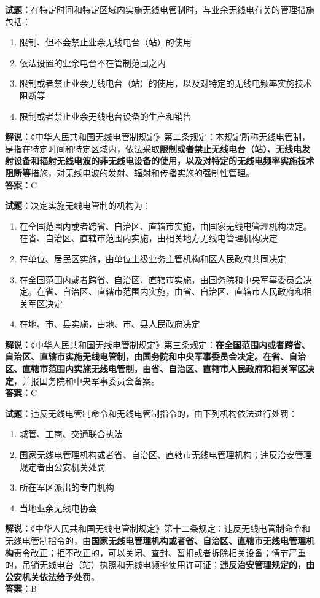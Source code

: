 \documentclass{ctexbook}
\begin{document}
\bigskip


\noindent\textbf{试题：}在特定时间和特定区域内实施无线电管制时，与业余无线电有关的管理措施包括：
\begin{enumerate}[leftmargin=3em]
	\item 限制、但不会禁止业余无线电台（站）的使用
	\item 依法设置的业余电台不在管制范围之内
	\item 限制或者禁止业余无线电台（站）的使用，以及对特定的无线电频率实施技术阻断等
	\item 限制或者禁止业余无线电台设备的生产和销售
\end{enumerate}
\noindent\textbf{解说：}《中华人民共和国无线电管制规定》第二条规定：本规定所称无线电管制，是指在特定时间和特定区域内，依法采取\textbf{限制或者禁止无线电台（站）、无线电发射设备和辐射无线电波的非无线电设备的使用，以及对特定的无线电频率实施技术阻断等}措施，对无线电波的发射、辐射和传播实施的强制性管理。\\\noindent\textbf{答案：}C


\bigskip


\noindent\textbf{试题：}决定实施无线电管制的机构为：
\begin{enumerate}[leftmargin=3em]
	\item 在全国范围内或者跨省、自治区、直辖市实施，由国家无线电管理机构决定。在省、自治区、直辖市范围内实施，由相关地方无线电管理机构决定
	\item 在单位、居民区实施，由单位上级业务主管机构和区人民政府共同决定
	\item 在全国范围内或者跨省、自治区、直辖市实施，由国务院和中央军事委员会决定。在省、自治区、直辖市范围内实施，由省、自治区、直辖市人民政府和相关军区决定
	\item 在地、市、县实施，由地、市、县人民政府决定
\end{enumerate}
\noindent\textbf{解说：}《中华人民共和国无线电管制规定》第三条规定：\textbf{在全国范围内或者跨省、自治区、直辖市实施无线电管制，由国务院和中央军事委员会决定。在省、自治区、直辖市范围内实施无线电管制，由省、自治区、直辖市人民政府和相关军区决定}，并报国务院和中央军事委员会备案。\\\noindent\textbf{答案：}C


\bigskip


\noindent\textbf{试题：}违反无线电管制命令和无线电管制指令的，由下列机构依法进行处罚：
\begin{enumerate}[leftmargin=3em]
	
	\item 城管、工商、交通联合执法
	\item 国家无线电管理机构或者省、自治区、直辖市无线电管理机构；违反治安管理规定者由公安机关处罚
	\item 所在军区派出的专门机构
	\item 当地业余无线电协会
\end{enumerate}
\noindent\textbf{解说：}《中华人民共和国无线电管制规定》第十二条规定：违反无线电管制命令和无线电管制指令的，由\textbf{国家无线电管理机构或者省、自治区、直辖市无线电管理机构}责令改正；拒不改正的，可以关闭、查封、暂扣或者拆除相关设备；情节严重的，吊销无线电台（站）执照和无线电频率使用许可证；\textbf{违反治安管理规定的，由公安机关依法给予处罚}。\\\noindent\textbf{答案：}B
\end{document}
